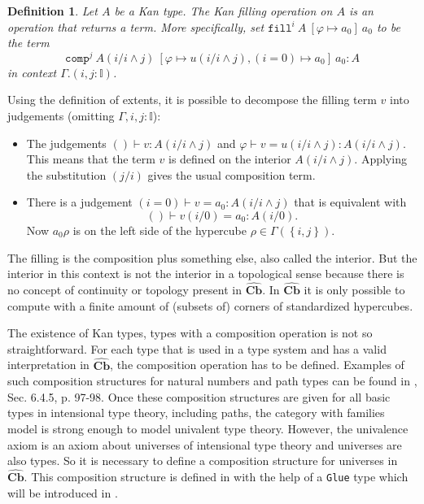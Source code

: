 \documentclass[12pt,a4paper,twoside,xetex]{book} %
\newcommand{\keyword}[1]{\emph{#1}\index{#1}}
\newtheorem{definition}[theorem]{Definition}
\newcommand{\psh}[1]{\widehat{#1}}
\newcommand{\op}[1]{\mathtt{#1}}
\newcommand{\cube}[0]{\textbf{Cb}}
\newcommand{\fillt}[5]{\op{fill}^{#1} \ {#2} \ \left[{#3} \mapsto {#5} \right] \ {#5}}
\begin{document}
\begin{definition}\label{filldef}
Let $A$ be a Kan type. The Kan \keyword{filling} operation on $A$ is an 
operation that returns a term. More specifically, set 
$\fillt{i}{A}{\varphi}{u}{a_0}$ to be the term $$\op{comp}^j \ A(i/i \wedge j) 
\ \left[\varphi \mapsto u(i/i \wedge j), (i=0) \mapsto a_0 \right] \ a_0 : A $$ 
in context $\Gamma . (i, j: \mathbb{I})$.
\end{definition}

Using the definition of extents, it is possible to decompose the filling term 
$v$ into judgements (omitting $\Gamma, i,j : \mathbb{I}$):

\begin{itemize}

\item The judgements $()\vdash v : A(i/i \wedge j)$ and $\varphi \vdash v = 
u(i/i \wedge j) : A(i/i \wedge j)$. 
This means that the term $v$ is defined on the interior $A(i/i \wedge j)$. 
Applying the substitution $(j/i)$ gives the usual composition term.

\item There is a judgement $(i = 0) \vdash v = a_0 : A(i/i \wedge j)$ that is 
equivalent with $$() \vdash v(i/0) = a_0 : A(i/0).$$
Now $a_0\rho$ is on the left side of the hypercube $\rho \in \Gamma \left( 
\left\{i,j\right\} \right)$.

\end{itemize}

The filling is the composition plus something else, also called the interior. 
But the interior in this context is not the interior in a topological sense 
because there is no concept of continuity or topology present in $\psh{\cube}$. In $\psh{\cube}$ it is only 
possible to compute with a finite amount of (subsets of) corners of 
standardized hypercubes.

The existence of Kan types, types with a composition operation is not so 
straightforward. For each type that is used in a type system and has a valid 
interpretation in $\psh{\cube}$, the composition operation 
has to be defined. Examples of such composition structures for natural numbers 
and path types can be found in \cite{Huber2016}, Sec. 6.4.5, p. 97-98. Once 
these composition structures are given for all basic types in intensional type 
theory, including paths, the category with families model is strong enough to 
model univalent type theory. However, the univalence axiom is an axiom about 
universes of intensional type theory and universes are also types. So it is 
necessary to define a composition structure for universes in $\psh{\cube}$. This composition structure is 
defined in \cite{Huber2016} with the help of a \texttt{Glue} type which will be 
introduced in . 
\end{document}

